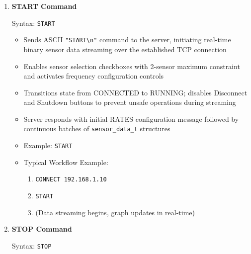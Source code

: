 \begin{enumerate}
    \item \textbf{START Command}

    Syntax: \texttt{START}

    \begin{itemize}
        \item Sends ASCII \texttt{"START\textbackslash n"} command to the server, initiating real-time binary sensor data streaming over the established TCP connection
        \item Enables sensor selection checkboxes with 2-sensor maximum constraint and activates frequency configuration controls
        \item Transitions state from CONNECTED to RUNNING; disables Disconnect and Shutdown buttons to prevent unsafe operations during streaming
        \item Server responds with initial RATES configuration message followed by continuous batches of \texttt{sensor\_data\_t} structures
        \item Example: \texttt{START}
        \item Typical Workflow Example:
        \begin{enumerate}
            \item \texttt{CONNECT 192.168.1.10}
            \item \texttt{START}
            \item (Data streaming begins, graph updates in real-time)
        \end{enumerate}
    \end{itemize}


    \item \textbf{STOP Command}

    Syntax: \texttt{STOP}


\end{enumerate}
